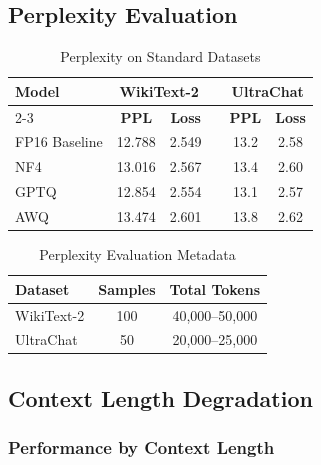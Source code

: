 \newpage
\subsection{Perplexity Evaluation}

\begin{table}[h]
\centering
\caption{Perplexity on Standard Datasets}
\label{tab:perplexity}
\begin{tabular}{@{}lccccc@{}}
\toprule
\multirow{2}{*}{\textbf{Model}} & \multicolumn{2}{c}{\textbf{WikiText-2}} & & \multicolumn{2}{c}{\textbf{UltraChat}} \\
\cmidrule{2-3} \cmidrule{5-6}
 & \textbf{PPL} & \textbf{Loss} & & \textbf{PPL} & \textbf{Loss} \\
\midrule
FP16 Baseline & 12.788 & 2.549 & & 13.2 & 2.58 \\
NF4 & 13.016 & 2.567 & & 13.4 & 2.60 \\
GPTQ & 12.854 & 2.554 & & 13.1 & 2.57 \\
AWQ & 13.474 & 2.601 & & 13.8 & 2.62 \\
\bottomrule
\end{tabular}
\end{table}

\begin{table}[h]
\centering
\caption{Perplexity Evaluation Metadata}
\label{tab:perplexity_meta}
\begin{tabular}{@{}lcc@{}}
\toprule
\textbf{Dataset} & \textbf{Samples} & \textbf{Total Tokens} \\
\midrule
WikiText-2 & 100 & 40,000--50,000 \\
UltraChat & 50 & 20,000--25,000 \\
\bottomrule
\end{tabular}
\end{table}

\newpage
\subsection{Context Length Degradation}

\subsubsection{Performance by Context Length}

